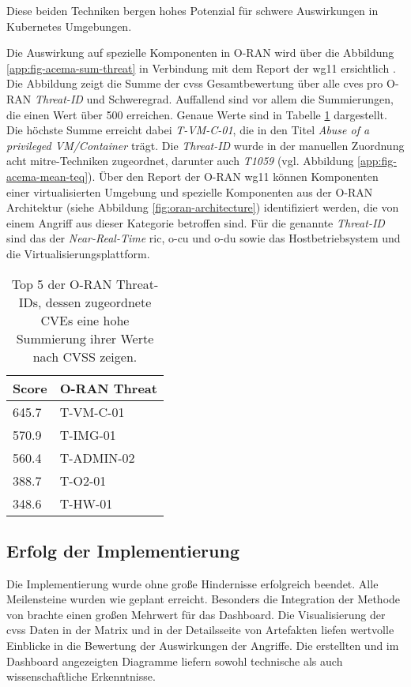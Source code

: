 Diese beiden Techniken bergen hohes Potenzial für schwere Auswirkungen in Kubernetes Umgebungen. 
\par Die Auswirkung auf spezielle Komponenten in O-RAN wird über die Abbildung \ref{app:fig-acema-sum-threat} in Verbindung mit dem Report der \gls{wg11} ersichtlich \autocite{o-ranworkgroup11securityworkgroupORANSecurityThreat2024}. Die Abbildung zeigt die Summe der \gls{cvss} Gesamtbewertung über alle \glspl{cve} pro O-RAN \textit{Threat-ID} und Schweregrad. Auffallend sind vor allem die Summierungen, die einen Wert über 500 erreichen. Genaue Werte sind in Tabelle \ref{tab:top5-threats} dargestellt. Die höchste Summe erreicht dabei \textit{T-VM-C-01}, die in \autocite{o-ranworkgroup11securityworkgroupORANSecurityThreat2024} den Titel \textit{Abuse of a privileged VM/Container} trägt. Die \textit{Threat-ID} wurde in der manuellen Zuordnung acht \gls{mitre}-Techniken zugeordnet, darunter auch \textit{T1059} (vgl. Abbildung \ref{app:fig-acema-mean-teq}). Über den Report der O-RAN \gls{wg11} können Komponenten einer virtualisierten Umgebung und spezielle Komponenten aus der O-RAN Architektur (siehe Abbildung \ref{fig:oran-architecture}) identifiziert werden, die von einem Angriff aus dieser Kategorie betroffen sind. Für die genannte \textit{Threat-ID} sind das der \textit{Near-Real-Time} \gls{ric}, \gls{o-cu} und \gls{o-du} sowie das Hostbetriebsystem und die Virtualisierungsplattform.

\begin{table}[h]
    \centering
    \caption{Top 5 der O-RAN Threat-IDs, dessen zugeordnete CVEs eine hohe Summierung ihrer Werte nach CVSS zeigen.}
    \begin{tabular}{|l|l|}
    \hline
        Score & O-RAN Threat \\ \hline
        645.7 & T-VM-C-01 \\ \hline
        570.9 & T-IMG-01 \\ \hline
        560.4 & T-ADMIN-02 \\ \hline
        388.7 & T-O2-01 \\ \hline
        348.6 & T-HW-01 \\ \hline
    \end{tabular}
    \label{tab:top5-threats}
\end{table}

\subsection{Erfolg der Implementierung}
Die Implementierung wurde ohne große Hindernisse erfolgreich beendet. Alle Meilensteine wurden wie geplant erreicht. Besonders die Integration der Methode von \citeauthor{klementSecuring6GTransition2024} brachte einen großen Mehrwert für das Dashboard. Die Visualisierung der \gls{cvss} Daten in der Matrix und in der Detailsseite von Artefakten liefen wertvolle Einblicke in die Bewertung der Auswirkungen der Angriffe. Die erstellten und im Dashboard angezeigten Diagramme liefern sowohl technische als auch wissenschaftliche Erkenntnisse.

